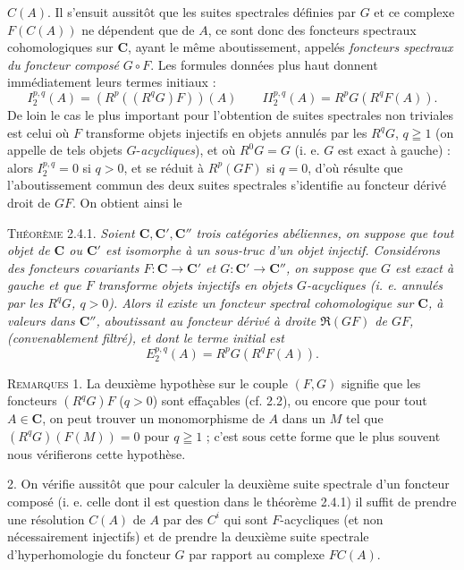 
\noindent $C(A)$. Il s'ensuit aussitôt que les suites spectrales définies par
$G$ et ce complexe $F(C(A))$ ne dépendent que de $A$, ce sont donc des
foncteurs spectraux cohomologiques sur $\mathbf{C}$, ayant le même aboutissement,
appelés \textit{foncteurs spectraux du foncteur composé} $G\mathbin{\circ}F$.
Les formules données plus haut donnent immédiatement leurs termes initiaux :
\[
I_2^{p,q}(A)=(R^p((R^qG)F))(A)
\qquad
II_2^{p,q}(A)=R^pG(R^qF(A)).
\]
De loin le cas le plus important pour l'obtention de suites spectrales non
triviales est celui où $F$ transforme objets injectifs en objets annulés
par les $R^qG$, $q\geqq1$ (on appelle de tels objets $G$-\textit{acycliques}), et où
$R^0G=G$ (i. e. $G$ est exact à gauche) : alors
$I_2^{p,q}=0$ si $q>0$, et se réduit à $R^p(GF)$ si $q=0$,
d'où résulte que l'aboutissement commun des deux suites spectrales s'identifie
au foncteur dérivé droit de $GF$. On obtient ainsi le

\textsc{Théorème 2.4.1.} \textit{Soient $\mathbf{C},\mathbf{C}',\mathbf{C}''$ trois
catégories abéliennes, on suppose que tout objet de $\mathbf{C}$ ou $\mathbf{C}'$ est isomorphe
à un sous-truc d'un objet injectif. Considérons des foncteurs covariants
$F:\mathbf{C}\to \mathbf{C}'$ et $G:\mathbf{C}'\to \mathbf{C}''$, on suppose que $G$ est
exact à gauche et que $F$ transforme objets injectifs en objets
$G$-acycliques \textup{(}i. e. annulés par les $R^qG$, $q>0$\textup{)}. Alors il existe un
foncteur spectral cohomologique sur $\mathbf{C}$, à valeurs dans $\mathbf{C}''$, aboutissant au
foncteur dérivé à droite $\mathfrak R(GF)$ de $GF$, \textup{(}convenablement filtré\textup{)},
et dont le terme initial est}
\[
\tag{2.4.3}
E_2^{p,q}(A)=R^pG(R^qF(A)).
\]

\textsc{Remarques 1.} La deuxième hypothèse sur le couple $(F,G)$
signifie que les foncteurs $(R^qG)F$ ($q>0$) sont effaçables (cf. 2.2), ou
encore que pour tout $A\in \mathbf{C}$, on peut trouver un monomorphisme de $A$ dans un
$M$ tel que $(R^qG)(F(M))=0$ pour $q\geqq1$ ; c'est sous cette forme que le plus
souvent nous vérifierons cette hypothèse.

2. On vérifie aussitôt que pour calculer la deuxième suite spectrale
d'un foncteur composé (i. e. celle dont il est question dans le théorème
2.4.1) il suffit de prendre une résolution $C(A)$ de $A$ par des $C^i$ qui
sont $F$-acycliques (et non nécessairement injectifs) et de prendre la
deuxième suite spectrale d'hyperhomologie du foncteur $G$ par rapport au
complexe $FC(A)$.


